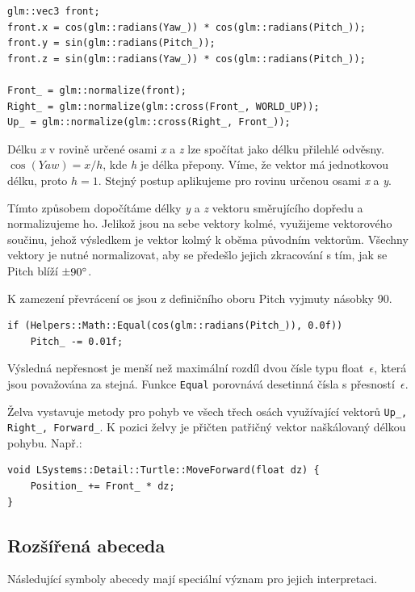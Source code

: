 \documentclass[thesis=M,czech]{FITthesis}[2019/12/23]
\begin{document}
\begin{verbatim}
glm::vec3 front;
front.x = cos(glm::radians(Yaw_)) * cos(glm::radians(Pitch_));
front.y = sin(glm::radians(Pitch_));
front.z = sin(glm::radians(Yaw_)) * cos(glm::radians(Pitch_));

Front_ = glm::normalize(front);
Right_ = glm::normalize(glm::cross(Front_, WORLD_UP));
Up_ = glm::normalize(glm::cross(Right_, Front_));
\end{verbatim}

Délku \textit{x} v rovině určené osami \textit{x} a \textit{z} lze spočítat jako délku přilehlé odvěsny. $\cos(Yaw) = x / h$, kde \textit{h} je délka přepony. Víme, že vektor má jednotkovou délku, proto $h = 1$. Stejný postup aplikujeme pro rovinu určenou osami \textit{x} a \textit{y}.

Tímto způsobem dopočítáme délky \textit{y} a \textit{z} vektoru směrujícího dopředu a normalizujeme ho. Jelikož jsou na sebe vektory kolmé, využijeme vektorového součinu, jehož výsledkem je vektor kolmý k oběma původním vektorům. Všechny vektory je nutné normalizovat, aby se předešlo jejich zkracování s tím, jak se Pitch blíží $\pm 90\degree$.

K zamezení převrácení os jsou z definičního oboru Pitch vyjmuty násobky 90\degree.

\begin{verbatim}
if (Helpers::Math::Equal(cos(glm::radians(Pitch_)), 0.0f))
    Pitch_ -= 0.01f;
\end{verbatim}

Výsledná nepřesnost je menší než maximální rozdíl dvou čísle typu float~$\epsilon$, která jsou považována za stejná. Funkce \texttt{Equal} porovnává desetinná čísla s přesností~$\epsilon$.

Želva vystavuje metody pro pohyb ve všech třech osách využívající vektorů \texttt{Up\_, Right\_, Forward\_}. K pozici želvy je přičten patřičný vektor naškálovaný délkou pohybu. Např.:

\begin{verbatim}
void LSystems::Detail::Turtle::MoveForward(float dz) {
    Position_ += Front_ * dz;
}
\end{verbatim}

\subsection{Rozšířená abeceda}
Následující symboly abecedy mají speciální význam pro jejich interpretaci.
\end{document}
